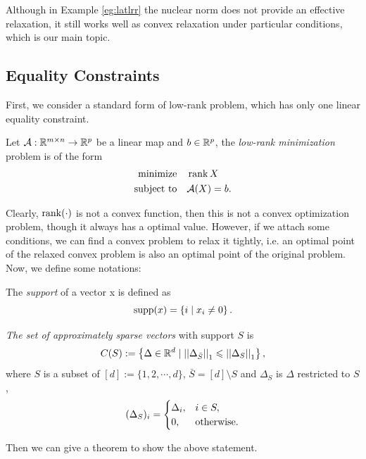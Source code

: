 \documentclass[11pt]{article}
\begin{document}
Although in Example \ref{eg:latlrr} the nuclear norm does not provide an effective relaxation, it still works well as convex relaxation under particular conditions, which is our main topic.

\subsection{Equality Constraints}

First, we consider a standard form of low-rank problem, which has only one linear equality constraint.
\begin{definition}\label{p:lr}
    Let \(\mathcal{A}:\mathbb R^{m\times n}\to \mathbb R^p\) be a linear map and \(b\in \mathbb R^p\), the \emph{low-rank minimization} problem is of the form 
    \[\begin{aligned}
        \textnormal{minimize}\quad & \operatorname{rank} X\\
        \textnormal{subject to}\quad & \mathcal A(X)=b.
    \end{aligned}\]
\end{definition}

Clearly, \(\operatorname{rank}(\cdot)\) is not a convex function, then this is not a convex optimization problem, though it always has a optimal value. However, if we attach some conditions, we can find a convex problem to relax it tightly, i.e. an optimal point of the relaxed convex problem is also an optimal point of the original problem. Now, we define some notations:

\begin{definition}[Support]
    The \emph{support} of a vector x is defined as
    \[\operatorname{supp}(x) = \left\{i \mid x_i \neq 0\right\}.\]
\end{definition}

\begin{definition}
    \emph{The set of approximately sparse vectors} with support \(S\) is 
    \[C(S):=\left\{\Delta \in \mathbb R^d \mid \left|\left|\Delta_{\bar{S}}\right|\right|_1\leqslant \left|\left|\Delta_S\right|\right|_1\right\},\]
    where \(S\) is a subset of \([d]:=\{1,2,\cdots,d\}\), \(\bar{S}=[d]\setminus S\) and \(\Delta_S\) is \(\Delta\) restricted to \(S\),
    \[(\Delta_S)_i = \begin{cases}
        \Delta_i, & i \in S,\\
        0, & \textnormal{otherwise}.
    \end{cases}\]
\end{definition}

Then we can give a theorem to show the above statement.
\end{document}

